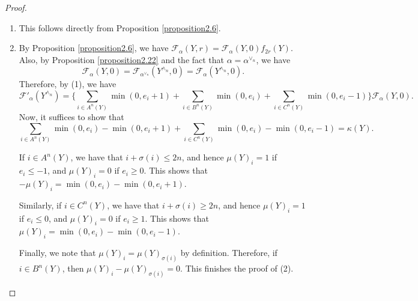 \documentclass[11pt,oneside]{amsart}
\theoremstyle{plain}
\theoremstyle{definition}
\theoremstyle{remark}
\newcommand{\CF}{{\mathcal F}}
\numberwithin{equation}{section}
\begin{document}
	\begin{proof}
		\begin{enumerate}
			\item This follows directly from Proposition \ref{proposition2.6}.
			
			\item By Proposition \ref{proposition2.6}, we have $\CF_{\alpha}(Y,r)=\CF_{\alpha}(Y,0)f_{2r}(Y)$. Also, by Proposition \ref{proposition2.22} and the fact that $\alpha=\alpha^{\vee_n}$, we have
			\begin{equation*}
				\CF_{\alpha}(Y,0)=\CF_{\alpha^{\vee_n}}(Y^{\wedge_n},0)=\CF_{\alpha}(Y^{\wedge_n},0).
			\end{equation*}
			Therefore, by (1), we have
			\begin{equation*}
				\CF'_{\alpha}(Y^{\wedge_n})=\lbrace\sum_{i \in A^n(Y)} \min(0,e_i+1)+\sum_{i \in B^n(Y)} \min(0,e_i)+\sum_{i \in C^n(Y)} \min(0,e_i-1)\rbrace \CF_{\alpha}(Y,0).
			\end{equation*}
			Now, it suffices to show that
			\begin{equation}\label{eq3.3}
				\sum_{i \in A^n(Y)}\min(0,e_i)-\min(0,e_i+1) +\sum_{i \in C^n(Y)}\min(0,e_i)-\min(0,e_i-1)=\kappa(Y).
			\end{equation}
			
			If $i \in A^n(Y)$, we have that $i+\sigma(i) \leq 2n$, and hence $\mu(Y)_i=1$ if $e_i \leq -1$, and $\mu(Y)_i=0$ if $e_i \geq 0$. This shows that $-\mu(Y)_i=\min(0,e_i)-\min(0,e_i+1)$.
			
			Similarly, if $i \in C^n(Y)$, we have that $i+\sigma(i) \geq 2n$, and hence $\mu(Y)_i=1$ if $e_i \leq 0$, and $\mu(Y)_i=0$ if $e_i \geq 1$. This shows that $\mu(Y)_i=\min(0,e_i)-\min(0,e_i-1)$.
			
			Finally, we note that $\mu(Y)_i=\mu(Y)_{\sigma(i)}$ by definition. Therefore, if $i \in B^n(Y)$, then $\mu(Y)_i-\mu(Y)_{\sigma(i)}=0$. This finishes the proof of (2).
			

\end{enumerate}
\end{proof}
\end{document}
